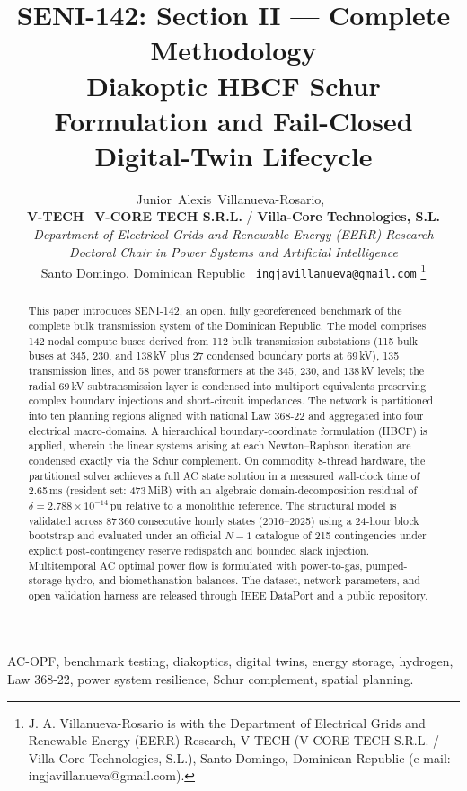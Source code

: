 \documentclass[11pt, journal, onecolumn]{IEEEtran}
\title{SENI-142: Section II — Complete Methodology\\Diakoptic HBCF Schur Formulation and Fail-Closed Digital-Twin Lifecycle}
\author{Junior~Alexis~Villanueva-Rosario,~\IEEEmembership{Ms.C., Ph.D.(c)}\\[0.3em]
{\normalsize\textnormal{\textbf{V-TECH} \textbar\ \textbf{V-CORE TECH S.R.L.} / \textbf{Villa-Core Technologies, S.L.}}}\\[0.15em]
{\footnotesize\textnormal{\textit{Department of Electrical Grids and Renewable Energy (EERR) Research}}}\\[0.15em]
{\footnotesize\textnormal{\textit{Doctoral Chair in Power Systems and Artificial Intelligence}}}\\[0.15em]
{\footnotesize\textnormal{Santo Domingo, Dominican Republic \textbar\ \texttt{ingjavillanueva@gmail.com}}}%
\thanks{J. A. Villanueva-Rosario is with the Department of Electrical Grids and Renewable Energy (EERR) Research, V-TECH (V-CORE TECH S.R.L. / Villa-Core Technologies, S.L.), Santo Domingo, Dominican Republic (e-mail: ingjavillanueva@gmail.com).}}
\begin{document}
\maketitle

\begin{abstract}
This paper introduces SENI-142, an open, fully georeferenced benchmark of the complete bulk transmission system of the Dominican Republic. The model comprises 142 nodal compute buses derived from 112 bulk transmission substations (115 bulk buses at 345, 230, and 138\,kV plus 27 condensed boundary ports at 69\,kV), 135 transmission lines, and 58 power transformers at the 345, 230, and 138\,kV levels; the radial 69\,kV subtransmission layer is condensed into multiport equivalents preserving complex boundary injections and short-circuit impedances. The network is partitioned into ten planning regions aligned with national Law 368-22 and aggregated into four electrical macro-domains. A hierarchical boundary-coordinate formulation (HBCF) is applied, wherein the linear systems arising at each Newton--Raphson iteration are condensed exactly via the Schur complement. On commodity 8-thread hardware, the partitioned solver achieves a full AC state solution in a measured wall-clock time of 2.65\,ms (resident set: 473\,MiB) with an algebraic domain-decomposition residual of $\delta = 2.788 \times 10^{-14}$\,pu relative to a monolithic reference. The structural model is validated across 87\,360 consecutive hourly states (2016--2025) using a 24-hour block bootstrap and evaluated under an official $N-1$ catalogue of 215 contingencies under explicit post-contingency reserve redispatch and bounded slack injection. Multitemporal AC optimal power flow is formulated with power-to-gas, pumped-storage hydro, and biomethanation balances. The dataset, network parameters, and open validation harness are released through IEEE DataPort and a public repository.
\end{abstract}

\begin{IEEEkeywords}
AC-OPF, benchmark testing, diakoptics, digital twins, energy storage, hydrogen, Law 368-22, power system resilience, Schur complement, spatial planning.
\end{IEEEkeywords}

\vspace{10pt}





\end{document}
